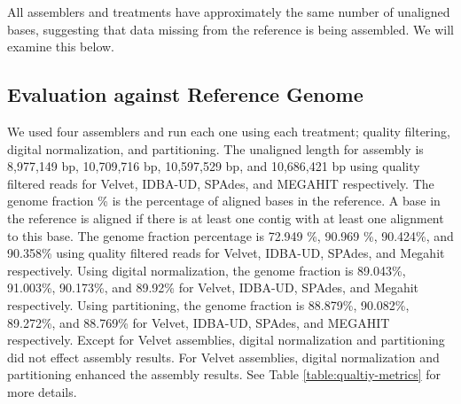 All assemblers and treatments have approximately the same number of
unaligned bases, suggesting that data missing from the reference is
being assembled.  We will examine this below.





\subsection*{Evaluation against Reference Genome}   

We used four assemblers and run each one using each treatment; quality
filtering, digital normalization, and partitioning.  The unaligned
length for assembly is 8,977,149 bp, 10,709,716 bp, 10,597,529 bp, and
10,686,421 bp using quality filtered reads for Velvet, IDBA-UD, SPAdes,
and MEGAHIT respectively.  The genome fraction \% is the percentage of
aligned bases in the reference. A base in the reference is aligned if
there is at least one contig with at least one alignment to this base.
The genome fraction percentage is 72.949 \%, 90.969 \%, 90.424\%, and
90.358\% using quality filtered reads for Velvet, IDBA-UD, SPAdes, and
Megahit respectively.  Using digital normalization, the genome
fraction is 89.043\%, 91.003\%, 90.173\%, and 89.92\% for Velvet,
IDBA-UD, SPAdes, and Megahit respectively.  Using partitioning, the
genome fraction is 88.879\%, 90.082\%, 89.272\%, and 88.769\% for
Velvet, IDBA-UD, SPAdes, and MEGAHIT respectively.  Except for Velvet assemblies, digital
normalization and partitioning did not effect assembly results. For Velvet assemblies, digital normalization and partitioning enhanced the assembly results. See
Table \ref{table:qualtiy-metrics} for more details.

